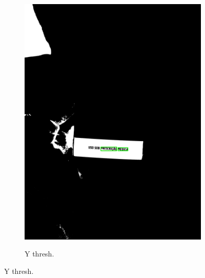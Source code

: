 \begin{figure}[htb]
\begin{subfigure}[t]{0.21\textwidth}
        \includegraphics[width=\linewidth]{../pictures/tysabri_cmyk_m_only_thresh_boxes.jpg}
    \end{subfigure}
    \hfill
    \begin{subfigure}[t]{0.21\textwidth}
        \centering
        \caption{Y thresh.}
        \label{fig:foto:versoes:2:Y_thresh:boxes}

\end{subfigure}
\end{figure}

